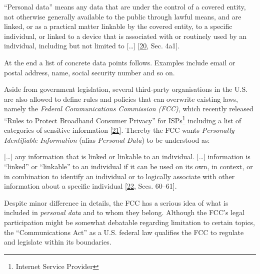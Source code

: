 \documentclass[12pt,english,a4paper,titlepage,cleardoublepage=empty,dottedtoc]{report}
\let\origquote\quote
\let\endorigquote\endquote
\renewenvironment{quote}{%
    \origquote
    \itshape
}
{\endorigquote}
\begin{document}
\begin{quote}
``Personal data'' means any data that are under the control of a covered
entity, not otherwise generally available to the public through lawful
means, and are linked, or as a practical matter linkable by the covered
entity, to a specific individual, or linked to a device that is
associated with or routinely used by an individual, including but not
limited to {[}\ldots{}{]}
{[}\protect\hyperlink{ref-bill-draft_2015_us_consumer-privacy-bill-of-rights-act_definition}{20},
Sec. 4a1{]}.
\end{quote}

At the end a list of concrete data points follows. Examples include
email or postal address, name, social security number and so on.

Aside from government legislation, several third-party organisations in
the U.S. are also allowed to define rules and policies that can
overwrite existing laws, namely the \emph{Federal Communications
Commission (FCC)}, which recently released ``Rules to Protect Broadband
Consumer Privacy'' for ISPs\footnote{Internet Service Provider}
including a list of categories of sensitive information
{[}\protect\hyperlink{ref-rules_2016_fcc_to-protect-broadband-consumer-privacy_sensitive-types-of-data}{21}{]}.
Thereby the FCC wants \emph{Personally Identifiable Information} (alias
\emph{Personal Data}) to be understood as:

\begin{quote}
{[}\ldots{}{]} any information that is linked or linkable to an
individual. {[}\ldots{}{]} information is ``linked'' or ``linkable'' to
an individual if it can be used on its own, in context, or in
combination to identify an individual or to logically associate with
other information about a specific individual
{[}\protect\hyperlink{ref-rules_2016_fcc_to-protect-broadband-consumer-privacy_personally-identifiable-information}{22},
Secs. 60--61{]}.
\end{quote}

Despite minor difference in details, the FCC has a serious idea of what
is included in \emph{personal data} and to whom they belong. Although
the FCC's legal participation might be somewhat debatable regarding
limitation to certain topics, the ``Communications Act'' as a U.S.
federal law qualifies the FCC to regulate and legislate within its
boundaries.
\end{document}
